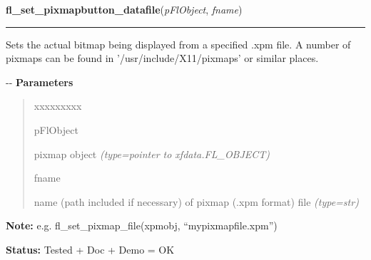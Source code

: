 \hspace{.8\funcindent}\begin{boxedminipage}{\funcwidth}

    \raggedright \textbf{fl\_set\_pixmapbutton\_datafile}(\textit{pFlObject}, \textit{fname})

    \vspace{-1.5ex}

    \rule{\textwidth}{0.5\fboxrule}
\setlength{\parskip}{2ex}

Sets the actual bitmap being displayed from a specified .xpm file. A
number of pixmaps can be found in '/usr/include/X11/pixmaps' or similar
places.

-{}-
\setlength{\parskip}{1ex}
      \textbf{Parameters}
      \vspace{-1ex}

      \begin{quote}
        \begin{Ventry}{xxxxxxxxx}

          \item[pFlObject]


pixmap object
            {\it (type=pointer to xfdata.FL\_OBJECT)}

          \item[fname]


name (path included if necessary) of pixmap (.xpm format) file
            {\it (type=str)}

        \end{Ventry}

      \end{quote}

\textbf{Note:} 
e.g. fl\_set\_pixmap\_file(xpmobj, ``mypixmapfile.xpm'')


\textbf{Status:} 
Tested + Doc + Demo = OK


    \end{boxedminipage}

    \label{xformslib:flbitmap:fl_set_pixmap_align}

    \vspace{0.5ex}

